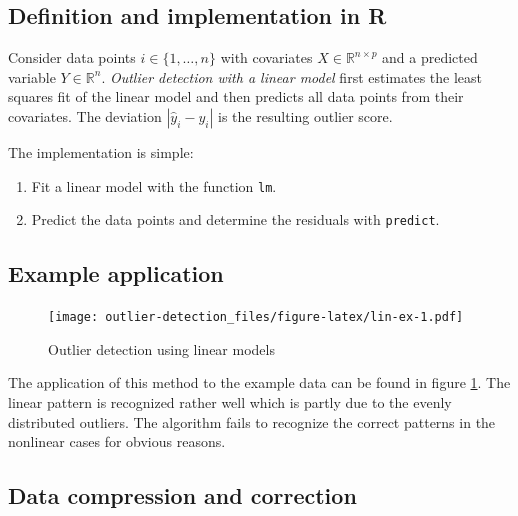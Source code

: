 \documentclass[]{report}
\theoremstyle{definition}
\theoremstyle{definition}
\theoremstyle{definition}
\theoremstyle{remark}
\let\BeginKnitrBlock\begin \let\EndKnitrBlock\end
\begin{document}
\hypertarget{definition-and-implementation-in-r}{%
\subsection{Definition and implementation in
R}\label{definition-and-implementation-in-r}}

\BeginKnitrBlock{definition}
\protect\hypertarget{def:unnamed-chunk-5}{}{\label{def:unnamed-chunk-5}
}Consider data points \(i\in\{1,\dotsc,n\}\) with covariates
\(X\in\mathbb{R}^{n\times p}\) and a predicted variable
\(Y\in\mathbb{R}^n\). \emph{Outlier detection with a linear model} first
estimates the least squares fit of the linear model and then predicts
all data points from their covariates. The deviation \(|\hat{y}_i-y_i|\)
is the resulting outlier score.
\EndKnitrBlock{definition}

The implementation is simple:

\begin{enumerate}
\def\labelenumi{\arabic{enumi}.}
\item
  Fit a linear model with the function \texttt{lm}.
\item
  Predict the data points and determine the residuals with
  \texttt{predict}.
\end{enumerate}

\hypertarget{example-application}{%
\subsection{Example application}\label{example-application}}

\begin{figure}
\centering
\texttt{[image: outlier-detection\_files/figure-latex/lin-ex-1.pdf]}
\caption{\label{fig:lin-ex}Outlier detection using linear models}
\end{figure}

The application of this method to the example data can be found in
figure \ref{fig:lin-ex}. The linear pattern is recognized rather well
which is partly due to the evenly distributed outliers. The algorithm
fails to recognize the correct patterns in the nonlinear cases for
obvious reasons.

\hypertarget{data-compression-and-correction}{%
\subsection{Data compression and
correction}\label{data-compression-and-correction}}
\end{document}
